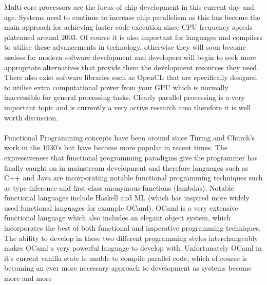 \documentclass[12pt,twoside,notitlepage]{report}
\begin{document}
%
%
%
Multi-core processors are the focus of chip development in this current day and age. Systems need to continue to increase chip parallelism as this has become the main approach for achieving faster code execution since CPU frequency
speeds plateaued around 2003\cite{hennessy2012}. Of course it is also important for languages and compilers to utilise these advancements in technology, otherwise they will soon become useless for modern software development and
developers will begin to seek more appropriate alternatives that provide them the development resources they need. There also exist software libraries such as OpenCL that are specifically designed to utilise extra computational power
from your GPU which is normally inaccessible for general processing tasks. Clearly parallel processing is a very important topic and is currently a very active research area therefore it is well worth discussion.
\hfill\\
\hfill\\
%
%
Functional Programming concepts have been around since Turing and Church's work in the 1930's\cite{scott2009} but have become more popular in recent times. The expressiveness that functional programming paradigms give the programmer
has finally caught on in mainstream development and therefore languages such as C++ and Java are incorporating notable functional programming techniques such as type inference\cite{web:autokeyword} and first-class anonymous functions
(lambdas)\cite{web:javalambda}. Notable functional languages include Haskell and ML (which has inspired more widely used functional languages for example OCaml\cite{madhavapeddy2013}). OCaml is a very extensive functional language
which also includes an elegant object system, which incorporates the best of both functional and imperative programming techniques. The ability to develop in these two different programming styles interchangeably makes OCaml a very
powerful language to develop with. Unfortunately OCaml in it's current vanilla state is unable to compile parallel code, which of course is becoming an ever more necessary approach to development as systems become more and more
\end{document}
